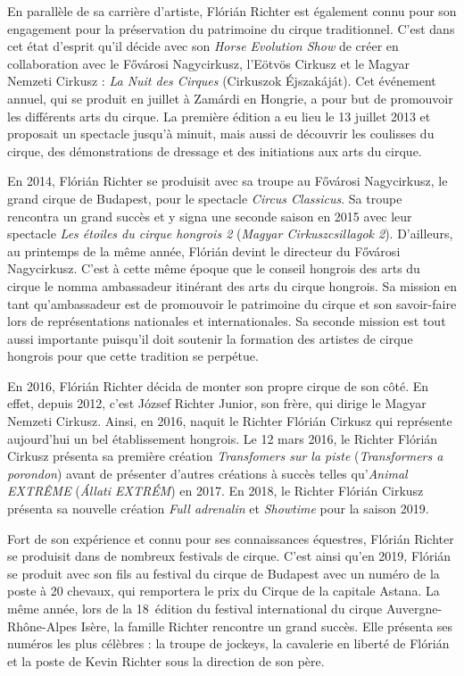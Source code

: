 En parallèle de sa carrière d’artiste, Flórián Richter est également connu pour son engagement pour la préservation du patrimoine du cirque traditionnel. C’est dans cet état d’esprit qu’il décide avec son \textit{Horse Evolution Show} de créer en collaboration avec le Fővárosi Nagycirkusz, l'Eötvös Cirkusz et le Magyar Nemzeti Cirkusz : \textit{La Nuit des Cirques} (Cirkuszok Éjszakáját). Cet événement annuel, qui se produit en juillet à Zamárdi en Hongrie, a pour but de promouvoir les différents arts du cirque. La première édition a eu lieu le 13 juillet 2013 et proposait un spectacle jusqu’à minuit, mais aussi de découvrir les coulisses du cirque, des démonstrations de dressage et des initiations aux arts du cirque. 

En 2014, Flórián Richter se produisit avec sa troupe au Fővárosi Nagycirkusz, le grand cirque de Budapest, pour le spectacle \textit{Circus Classicus}. Sa troupe rencontra un grand succès et y signa une seconde saison en 2015 avec leur spectacle \textit{Les étoiles du cirque hongrois 2} (\textit{Magyar Cirkuszcsillagok 2}). D’ailleurs, au printemps de la même année, Flórián devint le directeur du Fővárosi Nagycirkusz. C’est à cette même époque que le conseil hongrois des arts du cirque le nomma ambassadeur itinérant des arts du cirque hongrois. Sa mission en tant qu’ambassadeur est de promouvoir le patrimoine du cirque et son savoir-faire lors de représentations nationales et internationales. Sa seconde mission est tout aussi importante puisqu’il doit soutenir la formation des artistes de cirque hongrois pour que cette tradition se perpétue.

En 2016, Flórián Richter décida de monter son propre cirque de son côté. En effet, depuis 2012, c’est József Richter Junior, son frère, qui dirige le Magyar Nemzeti Cirkusz. Ainsi, en 2016, naquit le Richter Flórián Cirkusz qui représente aujourd’hui un bel établissement hongrois. Le 12 mars 2016, le Richter Flórián Cirkusz présenta sa première création \textit{Transfomers sur la piste }(\textit{Transformers a porondon}) avant de présenter d’autres créations à succès telles qu’\textit{Animal EXTRÊME} (\textit{Állati EXTRÉM}) en 2017. En 2018, le Richter Flórián Cirkusz présenta sa nouvelle création \textit{Full adrenalin} et \textit{Showtime} pour la saison 2019. 

Fort de son expérience et connu pour ses connaissances équestres, Flórián Richter se produisit dans de nombreux festivals de cirque. C’est ainsi qu’en 2019, Flórián se produit avec son fils au festival du cirque de Budapest avec un numéro de la poste à 20 chevaux, qui remportera le prix du Cirque de la capitale Astana. La même année, lors de la 18\ieme~édition du festival international du cirque Auvergne-Rhône-Alpes Isère, la famille Richter rencontre un grand succès. Elle présenta ses numéros les plus célèbres : la troupe de jockeys, la cavalerie en liberté de Flórián et la poste de Kevin Richter sous la direction de son père.


